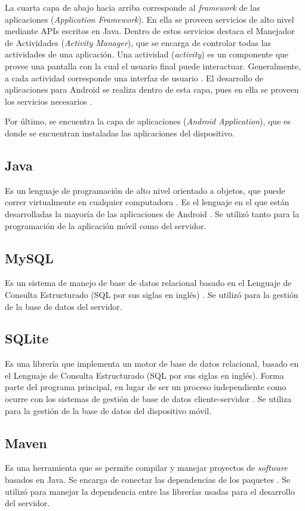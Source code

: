 La cuarta capa de abajo hacia arriba corresponde al \textit{framework} de las aplicaciones (\textit{Application Framework}). En ella se proveen servicios de alto nivel mediante APIs escritos en Java. Dentro de estos servicios destaca el Manejador de Actividades (\textit{Activity Manager}), que se encarga de controlar todas las actividades de una aplicación\cite{AND3}. Una actividad (\textit{activity}) es un componente que provee una pantalla con la cual el usuario final puede interactuar. Generalmente, a cada actividad corresponde una interfaz de usuario \cite{AND6}. El desarrollo de aplicaciones para Android se realiza dentro de esta capa, pues en ella se proveen los servicios necesarios \cite{AND5}.

Por último, se encuentra la capa de aplicaciones (\textit{Android Application}), que es donde se encuentran instaladas las aplicaciones del dispositivo\cite{AND3}.

\subsection{Java}
Es un lenguaje de programación de alto nivel orientado a objetos, que puede correr virtualmente en cualquier computadora \cite{JAV1}. Es el lenguaje en el que están desarrolladas la mayoría de las aplicaciones de Android \cite{AND2}. Se utilizó tanto para la programación de la aplicación móvil como del servidor.

\subsection{MySQL} 
Es un sistema de manejo de base de datos relacional basado en el Lenguaje de Consulta Estructurado (SQL por sus siglas en inglés) \cite{SQL1}. Se utilizó para la gestión de la base de datos del servidor.

\subsection{SQLite}
Es una librería que implementa un motor de base de datos relacional, basado en el Lenguaje de Consulta Estructurado (SQL por sus siglas en inglés). Forma parte del programa principal, en lugar de ser un proceso independiente como ocurre con los sistemas de gestión de base de datos cliente-servidor \cite{SQL2}. Se utiliza para la gestión de la base de datos del dispositivo móvil.

\subsection{Maven}
Es una herramienta que se permite compilar y  manejar proyectos de \textit{software} basados en Java. Se encarga de conectar las dependencias de los paquetes \cite{MVN1}. Se utilizó para manejar la dependencia entre las librerías usadas para el desarrollo del servidor.

